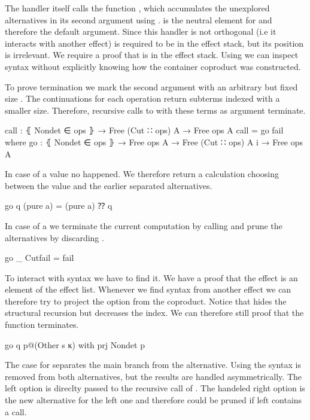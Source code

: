 \begin{AgdaAlign}
The handler itself calls the function , which accumulates the
unexplored alternatives in its second argument using .
 is the neutral element for  and therefore
the default argument.
Since this handler is not orthogonal (i.e it interacts with another effect)
 is required to be in the effect stack, but its position is
irrelevant.
We require a proof that  is in the effect stack.
Using  we can inspect  syntax without
explicitly knowing how the container coproduct was constructed.

To prove termination we mark the second argument with an arbitrary but fixed size
.
The continuations for each operation return subterms indexed with a smaller size.
Therefore, recursive calls to  with these terms as argument
terminate.

\begin{code}
call : ⦃ Nondet ∈ ops ⦄ → Free (Cut ∷ ops) A → Free ops A
call = go fail
  where
    go : ⦃ Nondet ∈ ops ⦄ → Free ops A → Free (Cut ∷ ops) A {i} → Free ops A
\end{code}
In case of a  value no 
happened.
We therefore return a calculation choosing between the value and the earlier
separated alternatives.

\begin{code}
    go q (pure a)       = (pure a) ⁇ q
\end{code}
In case of a  we terminate the current computation by calling
 and prune the alternatives by discarding .

\begin{code}
    go _ Cutfail        = fail
\end{code}
To interact with  syntax we have to find it.
We have a proof that the  effect is an element of the effect
list.
Whenever we find syntax from another effect we can therefore try to project the
 option from the coproduct.
Notice that  hides the structural recursion but decreases the
 index.
We can therefore still proof that the function terminates.

\begin{code}
    go q p@(Other s κ)  with prj {Nondet} p
\end{code}
The case for  separates the main branch from the alternative.
Using  the  syntax is removed from both
alternatives, but the results are handled asymmetrically.
The left option is direclty passed to the recursive call of
.
The handeled right option is the new alternative for the left one and therefore
could be pruned if left contains a  call.


\end{AgdaAlign}
